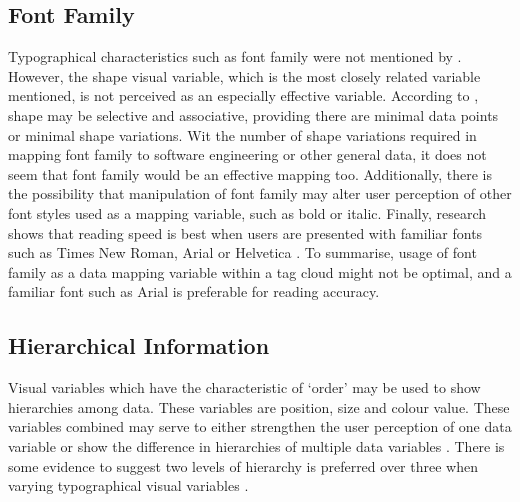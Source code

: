 \subsection{Font Family}   

Typographical characteristics such as font family were not mentioned by \citet{bertin83}. However, the shape visual variable, which is the most closely related variable mentioned, is not perceived as an especially effective variable. According to \citet{carpendale03}, shape may be selective and associative, providing there are minimal data points or minimal shape variations. Wit the number of shape variations required in mapping font family to software engineering or other general data, it does not seem that font family would be an effective mapping too. Additionally, there is the possibility that manipulation of font family may alter user perception of other font styles used as a mapping variable, such as bold or italic. Finally, research shows that reading speed is best when users are presented with familiar fonts such as Times New Roman, Arial or Helvetica  \citep[pg 106, chap 11:7][]{usability06}. To summarise, usage of font family as a data mapping variable within a tag cloud might not be optimal, and a familiar font such as Arial is preferable for reading accuracy.

\subsection{Hierarchical Information} 
Visual variables which have the characteristic of `order' may be used to show hierarchies among data. These variables are position, size and colour value. These variables combined may serve to either strengthen the user perception of one data variable or show the difference in hierarchies of multiple data variables \citep{deeb12}. There is some evidence to suggest two levels of hierarchy is preferred over three when varying typographical visual variables \citep{deeb12}.




